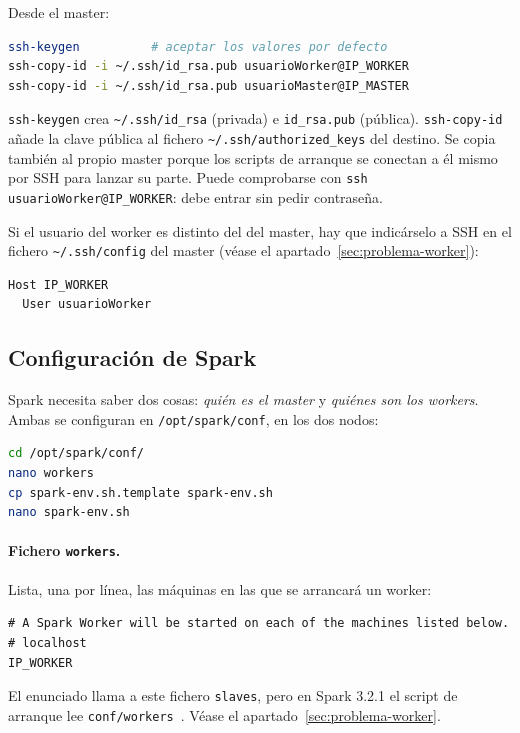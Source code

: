 \documentclass[11pt,a4paper]{article}
\begin{document}
Desde el master:
\begin{lstlisting}[language=bash]
ssh-keygen          # aceptar los valores por defecto
ssh-copy-id -i ~/.ssh/id_rsa.pub usuarioWorker@IP_WORKER
ssh-copy-id -i ~/.ssh/id_rsa.pub usuarioMaster@IP_MASTER
\end{lstlisting}

\texttt{ssh-keygen} crea \texttt{\textasciitilde/.ssh/id\_rsa} (privada) e \texttt{id\_rsa.pub} (pública). \texttt{ssh-copy-id} añade la clave pública al fichero \texttt{\textasciitilde/.ssh/authorized\_keys} del destino. Se copia también al propio master porque los scripts de arranque se conectan a él mismo por SSH para lanzar su parte. Puede comprobarse con \texttt{ssh usuarioWorker@IP\_WORKER}: debe entrar sin pedir contraseña.

Si el usuario del worker es distinto del del master, hay que indicárselo a SSH en el fichero \texttt{\textasciitilde/.ssh/config} del master (véase el apartado~\ref{sec:problema-worker}):
\begin{lstlisting}
Host IP_WORKER
  User usuarioWorker
\end{lstlisting}

\subsection{Configuración de Spark}

Spark necesita saber dos cosas: \emph{quién es el master} y \emph{quiénes son los workers}. Ambas se configuran en \texttt{/opt/spark/conf}, en los dos nodos:

\begin{lstlisting}[language=bash]
cd /opt/spark/conf/
nano workers
cp spark-env.sh.template spark-env.sh
nano spark-env.sh
\end{lstlisting}

\paragraph{Fichero \texttt{workers}.} Lista, una por línea, las máquinas en las que se arrancará un worker:
\begin{lstlisting}
# A Spark Worker will be started on each of the machines listed below.
# localhost
IP_WORKER
\end{lstlisting}

\begin{aviso}
El enunciado llama a este fichero \texttt{slaves}, pero en Spark 3.2.1 el script de arranque lee \texttt{conf/workers}~\cite{spark-standalone}. Véase el apartado~\ref{sec:problema-worker}.
\end{aviso}
\end{document}

